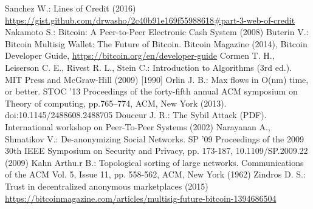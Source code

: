 \documentclass[11pt]{llncs}
\theoremstyle{definition}
\begin{document}
  \begin{thebibliography}{20}
     Sanchez W.: Lines of Credit (2016) \url{https://gist.github.com/drwasho/2c40b91e169f55988618#part-3-web-of-credit}
     Nakamoto S.: Bitcoin: A Peer-to-Peer Electronic Cash System (2008)
     Buterin V.: Bitcoin Multisig Wallet: The Future of Bitcoin. Bitcoin Magazine (2014),
     Bitcoin Developer Guide, \url{https://bitcoin.org/en/developer-guide}
     Cormen T. H., Leiserson C. E., Rivest R. L., Stein C.: Introduction to Algorithms (3rd ed.). MIT Press and McGraw-Hill
     (2009) [1990]
     Orlin J. B.: Max flows in O(nm) time, or better. STOC '13 Proceedings of the forty-fifth annual ACM symposium on Theory
     of computing, pp.765–774, ACM, New York (2013). doi:10.1145/2488608.2488705
     Douceur J. R.: The Sybil Attack (PDF). International workshop on Peer-To-Peer Systems (2002)
     Narayanan A., Shmatikov V.: De-anonymizing Social Networks. SP '09 Proceedings of the 2009 30th IEEE Symposium on
     Security and Privacy, pp. 173-187, 10.1109/SP.2009.22 (2009)
     Kahn Arthu.r B.: Topological sorting of large networks. Communications of the ACM Vol. 5, Issue 11, pp. 558-562, ACM,
     New York (1962)
     Zindros D. S.: Trust in decentralized anonymous marketplaces (2015)
     \url{https://bitcoinmagazine.com/articles/multisig-future-bitcoin-1394686504}
  \end{thebibliography}
\end{document}
